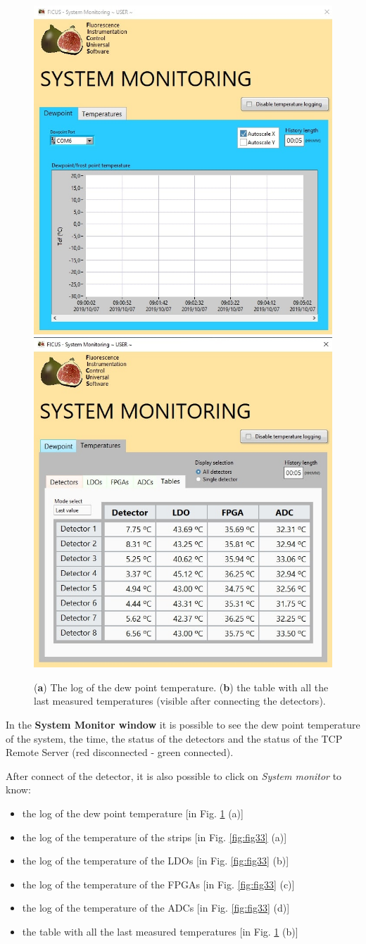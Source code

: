 \documentclass[a4paper,12pt,oneside,pdflatex,italian,final,twocolumn]{article}
\begin{document}
\begin{figure}[h]
\centering
\subfloat
{\includegraphics[width=.45\textwidth]{Cattura76.jpg}} \quad
\subfloat
{\includegraphics[width=.45\textwidth]{Capture47a.jpg}} \\
\caption{(\textbf{a}) The log of the dew point temperature. (\textbf{b}) the table with all the last measured temperatures (visible after connecting the detectors).}\label{fig:fig32}
\end{figure}

In the \textbf{System Monitor window} it is possible to see the dew point temperature of the system, the time, the status of the detectors and the status of the TCP Remote Server (red disconnected - green connected). 


After connect of the detector, it is also possible to click on \textit{System monitor} to know: 
\begin{itemize}
    \item the log of the dew point temperature [in Fig. \ref{fig:fig32} (a)]
    \item the log of the temperature of the strips [in Fig. \ref{fig:fig33} (a)]
    \item the log of the temperature of the LDOs [in Fig. \ref{fig:fig33} (b)]
    \item the log of the temperature of the FPGAs [in Fig. \ref{fig:fig33} (c)]
    \item the log of the temperature of the ADCs [in Fig. \ref{fig:fig33} (d)]
    \item the table with all the last measured temperatures [in Fig. \ref{fig:fig32} (b)]
\end{itemize}
\end{document}
